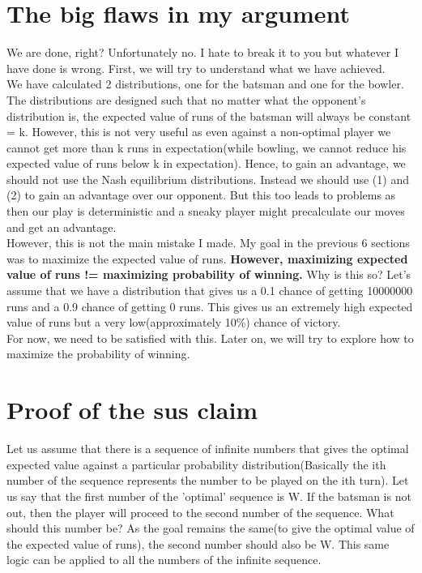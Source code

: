 \documentclass{article}
\begin{document}
\section{The big flaws in my argument}
We are done, right? Unfortunately no. I hate to break it to you but whatever I have done is wrong. First, we will try to understand what we have achieved.
\\
We have calculated 2 distributions, one for the batsman and one for the bowler. The distributions are designed such that no matter what the opponent's distribution is, the expected value of runs of the batsman will always be constant = k. However, this is not very useful as even against a non-optimal player we cannot get more than k runs in expectation(while bowling, we cannot reduce his expected value of runs below k in expectation). Hence, to gain an advantage, we should not use the Nash equilibrium distributions. Instead we should use (1) and (2) to gain an advantage over our opponent. But this too leads to problems as then our play is deterministic and a sneaky player might precalculate our moves and get an advantage.
\\
However, this is not the main mistake I made. My goal in the previous 6 sections was to maximize the expected value of runs. \textbf{However, maximizing expected value of runs != maximizing probability of winning.} Why is this so? Let's assume that we have a distribution that gives us a 0.1 chance of getting 10000000 runs and a 0.9 chance of getting 0 runs. This gives us an extremely high expected value of runs but a very low(approximately 10\%) chance of victory. 
\\
For now, we need to be satisfied with this. Later on, we will try to explore how to maximize the probability of winning.
\section*{Proof of the sus claim}
Let us assume that there is a sequence of infinite numbers that gives the optimal expected value against a particular probability distribution(Basically the ith number of the sequence represents the number to be played on the ith turn). Let us say that the first number of the 'optimal' sequence is W. If the batsman is not out, then the player will proceed to the second number of the sequence. What should this number be? As the goal remains the same(to give the optimal value of the expected value of runs), the second number should also be W. This same logic can be applied to all the numbers of the infinite sequence.
\end{document}
